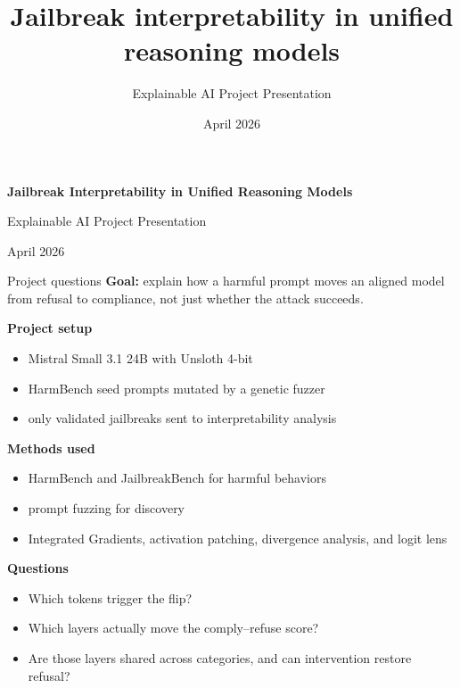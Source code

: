 \documentclass[aspectratio=169]{beamer}
\title{Jailbreak interpretability in unified reasoning models}
\subtitle{Explainable AI Project Presentation}
\author{}
\date{April 2026}
\begin{document}
\begin{frame}
  \centering
  \vspace*{1.5cm}

  {\fontsize{22}{26}\selectfont\bfseries\color{black}
  Jailbreak Interpretability in Unified Reasoning Models\par}

  \vspace{0.7cm}

  {\fontsize{14}{18}\selectfont\color{black}
  Explainable AI Project Presentation\par}

  \vspace{1.4cm}

  {\large\color{black}April 2026\par}
\end{frame}

\begin{frame}{Project questions}
\scriptsize
\textbf{Goal:} explain how a harmful prompt moves an aligned model from refusal to compliance, not just whether the attack succeeds.

\vspace{0.3em}
\textbf{Project setup}
\begin{itemize}
  \item Mistral Small 3.1 24B with Unsloth 4-bit
  \item HarmBench seed prompts mutated by a genetic fuzzer
  \item only validated jailbreaks sent to interpretability analysis
\end{itemize}

\vspace{0.3em}
\textbf{Methods used}
\begin{itemize}
  \item HarmBench and JailbreakBench for harmful behaviors
  \item prompt fuzzing for discovery
  \item Integrated Gradients, activation patching, divergence analysis, and logit lens
\end{itemize}

\vspace{0.3em}
\textbf{Questions}
\begin{itemize}
  \item Which tokens trigger the flip?
  \item Which layers actually move the comply--refuse score?
  \item Are those layers shared across categories, and can intervention restore refusal?
\end{itemize}
\end{frame}
\end{document}
